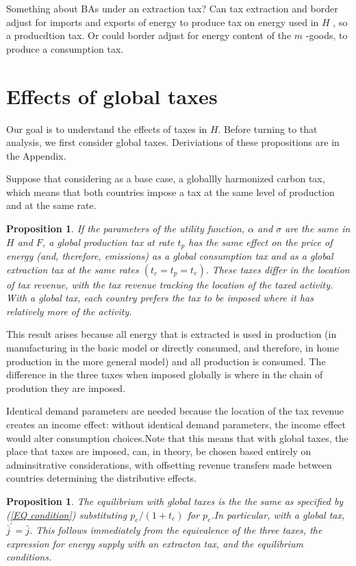 \documentclass[notitlepage,12pt]{article}
\newtheorem{proposition}[theorem]{Proposition}
\begin{document}
Something about BAs under an extraction tax? Can tax extraction and border
adjust for imports and exports of energy to produce tax on energy used in $H$%
, so a producdtion tax. Or could border adjust for energy content of the $m$%
-goods, to produce a consumption tax.

\section{Effects of global taxes}

Our goal is to understand the effects of taxes in $H$. Before turning to
that analysis, we first consider global taxes. Deriviations of these
propositions are in the Appendix.

Suppose that considering as a base case, a globallly harmonized carbon tax,
which means that both countries impose a tax at the same level of production
and at the same rate.

\begin{proposition}
If the parameters of the utility function, $\alpha $ and $\sigma $ are the
same in $H$ and $F$, a global production tax at rate $t_{p}$ has the same
effect on the price of energy (and, therefore, emissions) as a global
consumption tax and as a global extraction tax at the same rates $\left(
t_{c}=t_{p}=t_{e}\right) .$ These taxes differ in the location of tax
revenue, with the tax revenue tracking the location of the taxed activity.
With a global tax, each country prefers the tax to be imposed where it has
relatively more of the activity.
\end{proposition}

This result arises because all energy that is extracted is used in
production (in manufacturing in the basic model or directly consumed, and
therefore, in home production in the more general model) and all production
is consumed. The difference in the three taxes when imposed globally is
where in the chain of prodution they are imposed.

Identical demand parameters are needed because the location of the tax
revenue creates an income effect: without identical demand parameters, the
income effect would alter consumption choices.Note that this means that with
global taxes, the place that taxes are imposed, can, in theory, be chosen
based entirely on adminsitrative considerations, with offsetting revenue
transfers made between countries determining the distributive effects.

\begin{proposition}
The equilibrium with global taxes is the the same as specified by (\ref{EQ
condition}) substituting $p_{e}/\left( 1+t_{e}\right) $ for $p_{e}$.In
particular, with a global tax, $\bar{j}^{\prime }=\bar{j}$. This follows
immediately from the equivalence of the three taxes, the expression for
energy supply with an extracton tax, and the equilibrium conditions.
\end{proposition}
\end{document}
